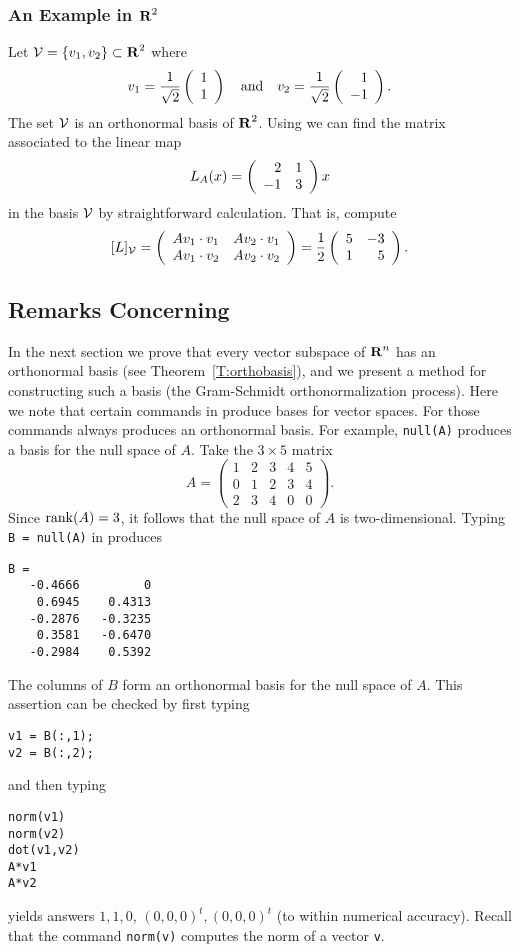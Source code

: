 \subsubsection{An Example in $\mbox{$\bf{R}$}^2$}

Let ${\cal V}=\{v_1,v_2\}\subset\mbox{$\bf{R}$}^2$ where
\[
v_1=\frac{1}{\sqrt{2}}\left(\begin{array}{r} 1 \\ 1\end{array}\right) \quad\mbox{and}\quad
v_2=\frac{1}{\sqrt{2}}\left(\begin{array}{r} 1 \\ -1\end{array}\right).
\]
The set ${\cal V}$ is an orthonormal basis of $\mbox{$\bf{R}$}^2$.  Using
 we can find the matrix associated to the linear map
\[
L_A(x) = \left(\begin{array}{rr} 2 & 1\\ -1 &3\end{array}\right)x
\]
in the basis ${\cal V}$ by straightforward calculation.  That is, compute
\[
[L]_{\cal V} =
\left(\begin{array}{rr} Av_1\cdot v_1 & Av_2\cdot v_1\\ Av_1\cdot v_2 &Av_2\cdot v_2\end{array}\right)
=\frac{1}{2}\left(\begin{array}{rr} 5 & -3\\ 1 &5\end{array}\right).
\]

\subsection*{Remarks Concerning \Matlab}

In the next section we prove that every vector subspace of $\mbox{$\bf{R}$}^n$ has an
orthonormal basis (see Theorem~\ref{T:orthobasis}), and we present a method
for constructing such a basis (the Gram-Schmidt orthonormalization process).
Here we note that certain commands in \Matlab produce bases for vector spaces.
For those commands \Matlab always produces an orthonormal basis.  For example,
{\tt null(A)} produces a basis for the null space
 of $A$.  Take the $3\times 5$ matrix
\begin{equation*}
\label{eq:Anull1}
A = \left(\begin{array}{rrrrr} 1 & 2 & 3 & 4 & 5\\ 0 & 1 & 2 & 3 & 4\\
2 & 3 & 4 & 0 & 0 \end{array}\right).
\end{equation*}
Since ${\rm rank}(A)=3$, it follows that the null space of $A$ is two-dimensional.
Typing {\tt B = null(A)} in \Matlab produces
\begin{verbatim}
B =
   -0.4666         0
    0.6945    0.4313
   -0.2876   -0.3235
    0.3581   -0.6470
   -0.2984    0.5392
\end{verbatim}
The columns of $B$ form an orthonormal basis for the null space of $A$.
This assertion can be checked by first typing
\begin{verbatim}
v1 = B(:,1);
v2 = B(:,2);
\end{verbatim}
and then typing
\begin{verbatim}
norm(v1)
norm(v2)
dot(v1,v2)
A*v1
A*v2
\end{verbatim}
yields answers $1,1,0$, $(0,0,0)^t,(0,0,0)^t$
(to within numerical accuracy).  Recall that the \Matlab
command {\tt norm(v)} computes the norm of a vector {\tt v}.





